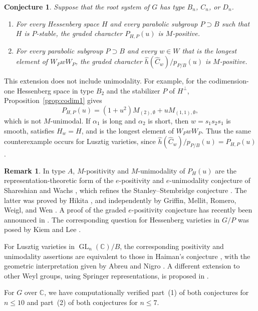 \documentclass[11pt]{amsart}
\numberwithin{equation}{section}
\newtheorem{conjecture}[theorem]{Conjecture}
\theoremstyle{definition}
\newtheorem{remark}[theorem]{Remark}
\def\C{\mathbb{C}}
\begin{document}
\begin{conjecture}\label{conj:classical.partial.positivity}
Suppose that the root system of $G$ has type $B_n$, $C_n$, or $D_n$.
\begin{enumerate}
	\item For every Hessenberg space $H$ and every parabolic subgroup $P\supset B$ such that $H$ is $P$-stable, the graded character $P_{H,P}(u)$ is $M$-positive.

	\item For every parabolic subgroup $P\supset B$ and every $w\in W$ that is the longest element of $W_PwW_P$, the graded character $\widehat h(\widehat C_w)/p_{P/B}(u)$ is $M$-positive.
\end{enumerate}
\end{conjecture}

This extension does not include unimodality.
For example, for the codimension-one Hessenberg space in type $B_2$ and the stabilizer $P$ of $H^\perp$, Proposition~\ref{prop:codim1} gives
\[P_{H,P}(u)=(1+u^2)M_{(2),\emptyset}+uM_{(1,1),\emptyset},\]
which is not $M$-unimodal.
If $\alpha_1$ is long and $\alpha_2$ is short, then $w=s_1s_2s_1$ is smooth, satisfies $H_w=H$, and is the longest element of $W_PwW_P$.
Thus the same counterexample occurs for Lusztig varieties, since $\widehat h(\widehat C_w)/p_{P/B}(u)=P_{H,P}(u)$.

\begin{remark}
In type $A$, $M$-positivity and $M$-unimodality of $P_H(u)$ are the representation-theoretic form of the $e$-positivity and $e$-unimodality conjecture of Shareshian and Wachs \cite[Conjecture~1.3]{SW}, which refines the Stanley--Stembridge conjecture \cite{stanley-stembridge}.
The latter was proved by Hikita \cite{Hikita}, and independently by Griffin, Mellit, Romero, Weigl, and Wen \cite{GMRWW}.
A proof of the graded $e$-positivity conjecture has recently been announced in \cite{OpenAI}.
The corresponding question for Hessenberg varieties in $G/P$ was posed by Kiem and Lee \cite[Question~4.9]{kiem-lee}.

For Lusztig varieties in $\operatorname{GL}_n(\C)/B$, the corresponding positivity and unimodality assertions are equivalent to those in Haiman's conjecture \cite[Conjecture~2.1]{haiman}, with the geometric interpretation given by Abreu and Nigro \cite{AN}.
A different extension to other Weyl groups, using Springer representations, is proposed in \cite{trinh2026haimansconjecturespringersrepresentations}.
\end{remark}



For $G$ over $\C$, we have computationally verified part~(1) of both conjectures for $n\leq10$ and part~(2) of both conjectures for $n\leq7$.












\end{document}
